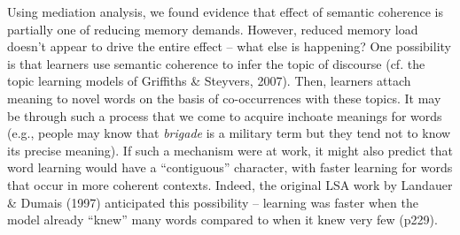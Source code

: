 \documentclass[man,floatsintext]{apa6}
\begin{document}

Using mediation analysis, we found evidence that effect of semantic coherence is partially one of reducing memory demands. However, reduced memory load doesn't appear to drive the entire effect -- what else is happening? One possibility is that learners use semantic coherence to infer the topic of discourse (cf. the topic learning models of Griffiths \& Steyvers, 2007). Then, learners attach meaning to novel words on the basis of co-occurrences with these topics. It may be through such a process that we come to acquire inchoate meanings for words (e.g., people may know that \emph{brigade} is a military term but they tend not to know its precise meaning). If such a mechanism were at work, it might also predict that word learning would have a ``contiguous'' character, with faster learning for words that occur in more coherent contexts. Indeed, the original LSA work by Landauer \& Dumais (1997) anticipated this possibility -- learning was faster when the model already ``knew'' many words compared to when it knew very few (p229).


\nocite{*} \newpage 

\end{document}
